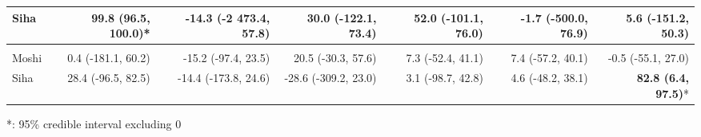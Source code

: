 \begin{table}[t]
\begin{tabular*}{\linewidth}{@{\extracolsep{\fill}}l|rrrrrr}
Siha & \textbf{99.8 (96.5, 100.0)}* & -14.3 (-2 473.4, 57.8) & 30.0 (-122.1, 73.4) & 52.0 (-101.1, 76.0) & -1.7 (-500.0, 76.9) & 5.6 (-151.2, 50.3) \\ 
\midrule\addlinespace[2.5pt]
\multicolumn{7}{l}{Schistosomiasis} \\[2.5pt] 
\midrule\addlinespace[2.5pt]
Moshi & 0.4 (-181.1, 60.2) & -15.2 (-97.4, 23.5) & 20.5 (-30.3, 57.6) & 7.3 (-52.4, 41.1) & 7.4 (-57.2, 40.1) & -0.5 (-55.1, 27.0) \\ 
Siha & 28.4 (-96.5, 82.5) & -14.4 (-173.8, 24.6) & -28.6 (-309.2, 23.0) & 3.1 (-98.7, 42.8) & 4.6 (-48.2, 38.1) & \textbf{82.8 (6.4, 97.5)}* \\ 
\bottomrule
\end{tabular*}
\begin{minipage}{\linewidth}
*: 95\% credible interval excluding 0\\
\end{minipage}
\end{table}

